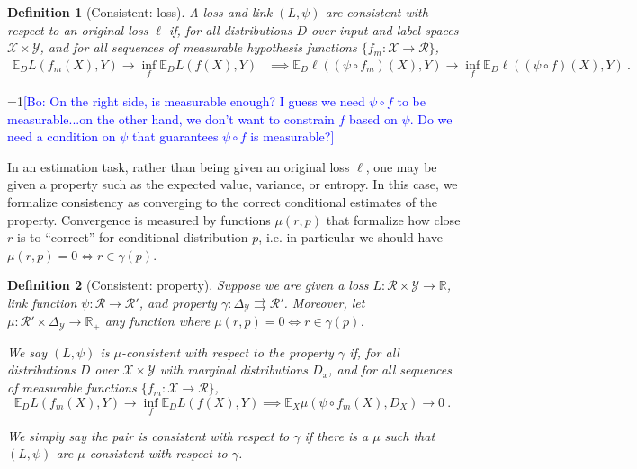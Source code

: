 \documentclass{article}
\newcommand{\Comments}{1}
\newcommand{\mynote}[2]{\ifnum\Comments=1\textcolor{#1}{#2}\fi}
\newcommand{\bo}[1]{\mynote{blue}{[Bo: #1]}}
\newcommand{\reals}{\mathbb{R}}
\newcommand{\simplex}{\Delta_\Y}
\newcommand{\propdis}{\mu}
\newcommand{\E}{\mathbb{E}}
\newcommand{\R}{\mathcal{R}}
\newcommand{\X}{\mathcal{X}}
\newcommand{\Y}{\mathcal{Y}}
\newcommand{\toto}{\rightrightarrows}
\newtheorem{definition}{Definition}
\begin{document}
\begin{definition}[Consistent: loss]\label{def:consistent-ell}
	A loss and link $(L,\psi)$ are consistent with respect to an original loss $\ell$ if, for all distributions $D$ over input and label spaces $\X \times\Y$, and for all sequences of measurable hypothesis functions $\{f_m : \X \to \R\}$,
	\begin{align*}
	\E_D L(f_m(X), Y) \to \inf_f \E_D L(f(X), Y) &\implies \E_D \ell((\psi \circ f_m)(X), Y) \to \inf_f \E_D \ell((\psi \circ f)(X), Y)~.~
	\end{align*}
\end{definition}
\bo{On the right side, is measurable enough? I guess we need $\psi \circ f$ to be measurable...on the other hand, we don't want to constrain $f$ based on $\psi$. Do we need a condition on $\psi$ that guarantees $\psi \circ f$ is measurable?}

In an estimation task, rather than being given an original loss $\ell$, one may be given a property such as the expected value, variance, or entropy.
In this case, we formalize consistency as converging to the correct conditional estimates of the property.
Convergence is measured by functions $\propdis(r, p)$ that formalize how close $r$ is to ``correct'' for conditional distribution $p$, i.e. in particular we should have $\propdis(r,p) = 0 \iff r \in \gamma(p)$.

\begin{definition}[Consistent: property]\label{def:consistent-prop}
	Suppose we are given a loss $L : \R \times \Y \to \reals$, link function $\psi: \R \to \R'$, and property $\gamma:\simplex \toto \R'$.
	Moreover, let $\propdis : \R' \times \simplex \to \reals_+$ any function where $\propdis(r,p) = 0 \iff r \in \gamma(p)$.
	
	We say $(L, \psi)$ is \emph{$\mu$-consistent with respect to the property} $\gamma$ if, for all distributions $D$ over $\X \times \Y$ with marginal distributions $D_x$, and for all sequences of measurable functions $\{f_m: \X \to \R\}$, 
	\begin{equation}
	\E_{D} L(f_m(X), Y) \to \inf_f \E_{D} L( f(X), Y) \implies \E_X \propdis(\psi \circ f_m(X), D_X) \to 0~.~
	\end{equation}
	
	We simply say the pair is consistent with respect to $\gamma$ if there is a $\propdis$ such that $(L,\psi)$ are $\propdis$-consistent with respect to $\gamma$.
\end{definition}
\end{document}
